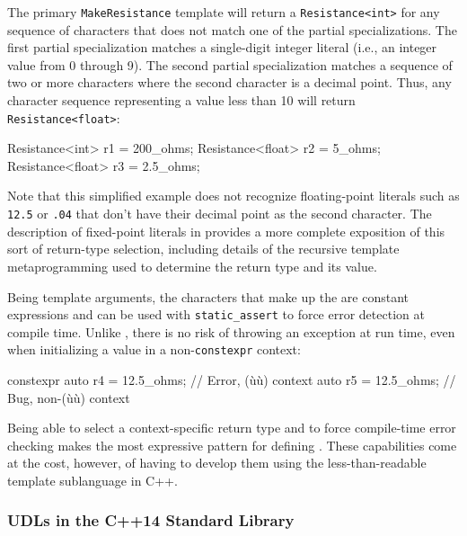 \noindent The primary \lstinline!MakeResistance! template will return a
\lstinline!Resistance<int>! for any sequence of characters that does not
match one of the partial specializations. The first partial
specialization matches a single-digit integer literal (i.e., an integer
value from 0 through 9). The second partial specialization matches a
sequence of two or more characters where the second character is a
decimal point. Thus, any character sequence representing a value less
than 10 will return \lstinline!Resistance<float>!:

\begin{emcppslisting}[emcppsbatch=e12]
Resistance<int>   r1 = 200_ohms;
Resistance<float> r2 = 5_ohms;
Resistance<float> r3 = 2.5_ohms;
\end{emcppslisting}
    
\noindent Note that this simplified example does not recognize floating-point
literals such as \lstinline!12.5! or \lstinline!.04! that don't have their
decimal point as the second character. The description of fixed-point
literals in  provides a more complete exposition of this sort
of return-type selection, including details of the recursive template
metaprogramming used to determine the return type and its value.

Being template arguments, the characters that make up the  are constant expressions and can be used with
\lstinline!static_assert! to force error detection at compile time. Unlike
, there is no risk of throwing an exception at
run time, even when initializing a value in a non-\lstinline!constexpr!
context:

\begin{emcppslisting}[emcppsbatch=e12]
constexpr auto r4 = 12.5_ohms;  // Error, (ù{}ù) context
          auto r5 = 12.5_ohms;  // Bug, non-(ù{}ù) context
\end{emcppslisting}
    
\noindent Being able to select a context-specific return type and to force
compile-time error checking makes  the
most expressive pattern for defining . These
capabilities come at the cost, however, of having to develop them using
the less-than-readable template sublanguage in C++.

\subsubsection[UDLs in the C++14 Standard Library]{UDLs in the C++14 Standard Library}\label{udls-in-the-c++14-standard-library}


